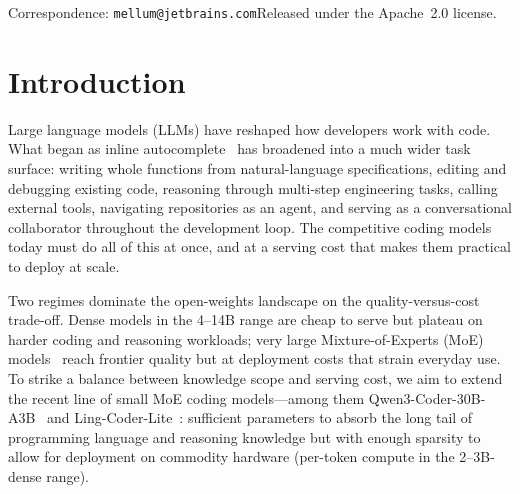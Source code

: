 \documentclass[11pt,a4paper]{article}
\begin{document}
\begin{center}
\vspace{0.8cm}

\end{center}

\par\vspace*{\fill}
{\small\color{mellum-gray}\noindent
Correspondence: \texttt{mellum@jetbrains.com}\hfill Released under the Apache~2.0 license.}
\par\vspace{6pt}
\noindent\makebox[0pt][l]{\hspace*{-2.4cm}\textcolor{mellum-primary}{\rule{\paperwidth}{3.5pt}}}\par
\vspace*{-1ex}

\clearpage





\section{Introduction}
\label{sec:introduction}

Large language models (LLMs) have reshaped how developers work with code.
What began as inline autocomplete~\cite{li2023starcoder} has broadened into
a much wider task surface: writing whole functions from
natural-language specifications, editing and debugging existing code,
reasoning through multi-step engineering tasks, calling external tools,
navigating repositories as an agent, and serving as a conversational
collaborator throughout the development loop. The competitive coding models
today must do all of this at once, and at a serving cost that makes them
practical to deploy at scale.

Two regimes dominate the open-weights landscape on the quality-versus-cost
trade-off. Dense models in the 4--14B range are cheap to serve but plateau on
harder coding and reasoning workloads; very large Mixture-of-Experts (MoE)
models~\cite{fedus2022switch,dai2024deepseekmoe} reach frontier quality but at
deployment costs that strain everyday use. To strike a balance between knowledge scope and serving cost, we aim to extend the recent line of small
MoE coding models---among them Qwen3-Coder-30B-A3B~\cite{yang2025qwen3} and Ling-Coder-Lite~\cite{codefuse2025lingcoderlite}: sufficient parameters to absorb the long tail of programming language and reasoning knowledge but with enough sparsity to allow for deployment on commodity hardware (per-token compute in the 2--3B-dense range).
  
\end{document}
